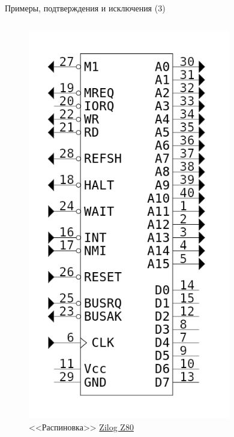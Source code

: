 \documentclass[xetex,aspectratio=43]{beamer}
\begin{document}
\begin{frame}{Примеры, подтверждения и исключения (3)}

\begin{columns}
    \begin{column}{0.5\textwidth}
        \begin{figure}
            \includegraphics[height=0.8\textheight]{img/05.Zilog_Z80_pinout.png}
            \caption{<<Распиновка>> \href{https://en.wikipedia.org/wiki/Zilog_Z80}{Zilog Z80}}
        \end{figure}
    \end{column}
    \begin{column}{0.5\textwidth}
        \begin{figure}

\end{figure}
\end{column}
\end{columns}
\end{frame}
\end{document}
